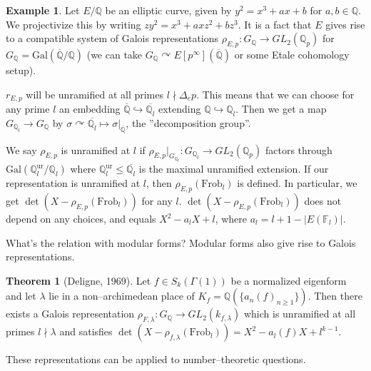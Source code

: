 \documentclass{article}
\theoremstyle{definition}
\newtheorem{theorem}{Theorem}[section]
\newtheorem{example}{Example}[section]
\begin{document}
\begin{example}
    Let $E/\mathbb{Q}$ be an elliptic curve, given by $y^2 = x^3+ax+b$ for $a, b \in \mathbb{Q}$. We projectivize this by writing $zy^2 = x^3 + axz^2 + bz^3$. It is a fact that $E$ gives rise to a compatible system of Galois representations $\rho_{E,p} : G_{\mathbb{Q}} \to GL_2(\mathbb{Q}_p)$ for $G_{\mathbb{Q}} = \text{Gal}(\overline{\mathbb{Q}}/\mathbb{Q})$ (we can take $G_{\mathbb{Q}} \curvearrowright E[p^{\infty}](\overline{\mathbb{Q}})$ or some Etale cohomology setup).
    \vspace{1mm}
     
    $r_{E,p}$ will be unramified at all primes $l \nmid \Delta_e p$. This means that we can choose for any prime $l$ an embedding $\overline{\mathbb{Q}} \hookrightarrow \overline{\mathbb{Q}_l}$ extending $\mathbb{Q} \hookrightarrow \mathbb{Q}_l$. Then we get a map $G_{\mathbb{Q}_l} \to G_{\mathbb{Q}}$ by $\sigma \curvearrowright \overline{\mathbb{Q}_l} \mapsto \sigma|_{\overline{\mathbb{Q}}}$, the ''decomposition group''.
    \vspace{1mm}
     
    We say $\rho_{E,p}$ is unramified at $l$ if $\rho_{E,p}|_{G_{\mathbb{Q}_l}} : G_{\mathbb{Q}_l} \to GL_2(\mathbb{Q}_p)$ factors through $\text{Gal}(\mathbb{Q}_l^{\text{ur}} /\mathbb{Q}_l)$ where $\mathbb{Q}_l^{\text{ur}}\le \overline{\mathbb{Q}_l}$ is the maximal unramified extension. If our representation is unramified at $l$, then $\rho_{E,p}(\text{Frob}_l)$ is defined. In particular, we get $\det(X-\rho_{E,p}(\text{Frob}_l))$ for any $l$. $\det(X-\rho_{E,p}(\text{Frob}_l))$ does not depend on any choices, and equals $X^2-a_l X + l$, where $a_l = l + 1 - |E(\mathbb{F}_l)|$.
\end{example}
What's the relation with modular forms? Modular forms also give rise to Galois representations.
\begin{theorem}[Deligne, 1969]
    Let $f \in S_k(\Gamma(1))$ be a normalized eigenform and let $\lambda$ lie in a non--archimedean place of $K_f = \mathbb{Q}(\{a_n(f)_{n\ge 1}\})$. Then there exists a Galois representation $\rho_{F,\lambda} : G_\mathbb{Q} \to GL_2(k_{f,\lambda})$ which is unramified at all primes $l \nmid \lambda$ and satisfies $\det(X-\rho_{f,\lambda}(\text{Frob}_l)) = X^2 - a_l(f)X + l^{k-1}$.
\end{theorem}
These representations can be applied to number--theoretic questions.
\end{document}
